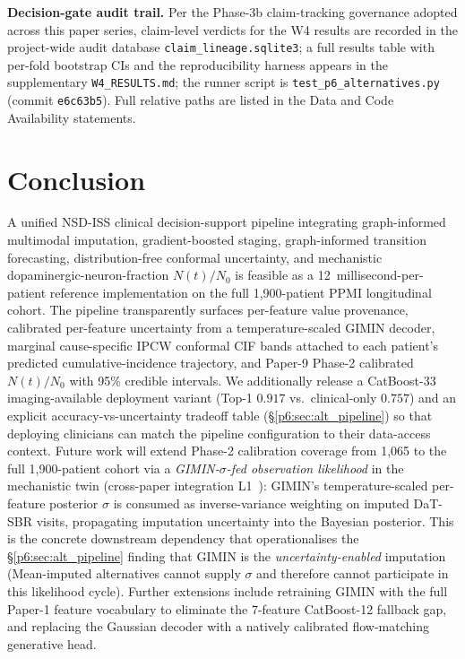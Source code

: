 \textbf{Decision-gate audit trail.} Per the Phase-3b claim-tracking governance adopted across this paper series, claim-level verdicts for the W4 results are recorded in the project-wide audit database \texttt{claim\_lineage.sqlite3}; a full results table with per-fold bootstrap CIs and the reproducibility harness appears in the supplementary \texttt{W4\_RESULTS.md}; the runner script is \texttt{test\_p6\_alternatives.py} (commit \texttt{e6c63b5}). Full relative paths are listed in the Data and Code Availability statements.

\section{Conclusion}
\label{p6:sec:conclusion}

A unified NSD-ISS clinical decision-support pipeline integrating graph-informed multimodal imputation, gradient-boosted staging, graph-informed transition forecasting, distribution-free conformal uncertainty, and mechanistic dopaminergic-neuron-fraction $N(t)/N_0$ is feasible as a 12~millisecond-per-patient reference implementation on the full 1,900-patient PPMI longitudinal cohort. The pipeline transparently surfaces per-feature value provenance, calibrated per-feature uncertainty from a temperature-scaled GIMIN decoder, marginal cause-specific IPCW conformal CIF bands attached to each patient's predicted cumulative-incidence trajectory, and Paper-9 Phase-2 calibrated $N(t)/N_0$ with 95\% credible intervals. We additionally release a CatBoost-33 imaging-available deployment variant (Top-1 $0.917$ vs.\ clinical-only $0.757$) and an explicit accuracy-vs-uncertainty tradeoff table (\S\ref{p6:sec:alt_pipeline}) so that deploying clinicians can match the pipeline configuration to their data-access context. Future work will extend Phase-2 calibration coverage from 1,065 to the full 1,900-patient cohort via a \emph{GIMIN-$\sigma$-fed observation likelihood} in the mechanistic twin (cross-paper integration L1~\cite{dupre2026paper10}): GIMIN's temperature-scaled per-feature posterior $\sigma$ is consumed as inverse-variance weighting on imputed DaT-SBR visits, propagating imputation uncertainty into the Bayesian posterior. This is the concrete downstream dependency that operationalises the §\ref{p6:sec:alt_pipeline} finding that GIMIN is the \emph{uncertainty-enabled} imputation (Mean-imputed alternatives cannot supply $\sigma$ and therefore cannot participate in this likelihood cycle). Further extensions include retraining GIMIN with the full Paper-1 feature vocabulary to eliminate the 7-feature CatBoost-12 fallback gap, and replacing the Gaussian decoder with a natively calibrated flow-matching generative head.
